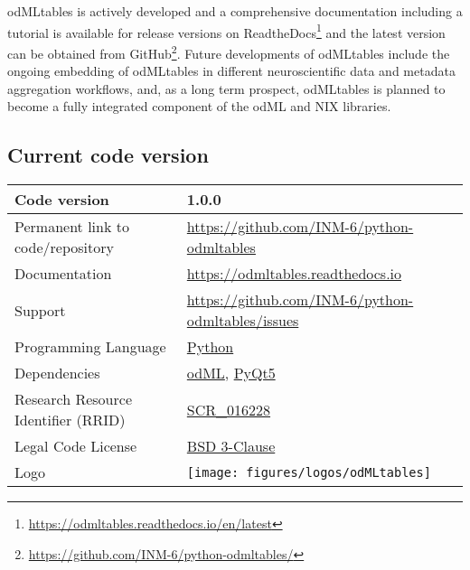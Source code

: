 odMLtables is actively developed and a comprehensive documentation including a tutorial is available for release versions on ReadtheDocs\footnote{\url{https://odmltables.readthedocs.io/en/latest}} and the latest version can be obtained from GitHub\footnote{\url{https://github.com/INM-6/python-odmltables/}}. Future developments of odMLtables include the ongoing embedding of odMLtables in different neuroscientific data and metadata aggregation workflows, and, as a long term prospect, odMLtables is planned to become a fully integrated component of the odML and NIX libraries.


\subsection{Current code version}
\label{sec:code_version}

\begin{tabular}{ll}
\hline
Code version & 1.0.0 \\
\hline
Permanent link to code/repository & \href{https://github.com/INM-6/python-odmltables}{https://github.com/INM-6/python-odmltables}\\
\hline
Documentation & \href{https://odmltables.readthedocs.io}{https://odmltables.readthedocs.io}\\
\hline
Support & \href{https://github.com/INM-6/python-odmltables/issues}{https://github.com/INM-6/python-odmltables/issues}\\
\hline
Programming Language & \href{https://www.python.org/}{Python}\\
\hline
Dependencies & \href{http://g-node.github.io/python-odml/}{odML}, \href{https://wiki.python.org/moin/PyQt}{PyQt5}\\  
\hline
Research Resource Identifier (RRID) & \href{https://scicrunch.org/scicrunch/Resources/record/nlx_144509-1/SCR_016228/resolver}{SCR\_016228}\\
\hline
Legal Code License  & \href{https://github.com/INM-6/python-odmltables/blob/master/LICENSE.txt}{BSD 3-Clause} \\
\hline
Logo &
\texttt{[image: figures/logos/odMLtables]}\\
\hline
\end{tabular}



